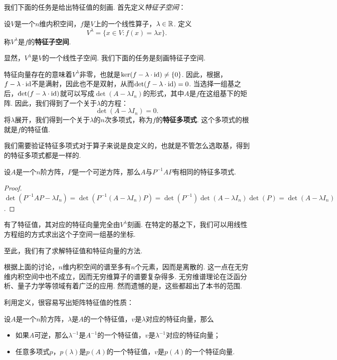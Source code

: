 我们下面的任务是给出特征值的刻画. 首先定义\textit{特征子空间}：

\begin{definition}[特征子空间]
设$V$是一个$n$维内积空间，$f$是$V$上的一个线性算子，$\lambda\in\mathbb{R}$. 定义
\[V^\lambda=\{x\in V:f(x)=\lambda x\}.\]
称$V^\lambda$是$f$的\textbf{特征子空间}. 
\end{definition}

显然，$V^\lambda$是$V$的一个线性子空间. 我们下面的任务是刻画特征子空间. 

特征向量存在的意味着$V^\lambda$非零，也就是$\ker(f-\lambda\cdot \mathrm{id})\neq\{0\}$. 因此，根据，$f-\lambda\cdot \mathrm{id}$不是满射，因此也不是双射，从而$\det(f-\lambda\cdot \mathrm{id})=0$. 当选择一组基之后，$\det(f-\lambda\cdot \mathrm{id})$就可以写成$\det(A-\lambda I_n)$的形式，其中$A$是$f$在这组基下的矩阵. 因此，我们得到了一个关于$\lambda$的方程：
\begin{equation}\label{eq:characteristic-equation}
    \det(A-\lambda I_n)=0.
\end{equation}
将$\lambda$展开，我们得到一个关于$\lambda$的$n$次多项式，称为$f$的\textbf{特征多项式}. 这个多项式的根就是$f$的特征值. 

我们需要验证特征多项式对于算子来说是良定义的，也就是不管怎么选取基，得到的特征多项式都是一样的.

\begin{proposition}\label{proposition:similar-matrix-same-characteristic-polynomial}
    设$A$是一个$n$阶方阵，$P$是一个可逆方阵，那么$A$与$P^{-1}AP$有相同的特征多项式. 
\end{proposition}
\begin{proof}
    $\det(P^{-1}AP-\lambda I_n)=\det(P^{-1}(A-\lambda I_n)P)=\det(P^{-1})\det(A-\lambda I_n)\det(P)=\det(A-\lambda I_n)$.
\end{proof}

有了特征值，其对应的特征向量完全由$V^\lambda$刻画. 在特定的基之下，我们可以用线性方程组的方式求出这个子空间一组基的坐标. 

至此，我们有了求解特征值和特征向量的方法. 

\begin{remark}
根据上面的讨论，$n$维内积空间的谱至多有$n$个元素，因而是离散的. 这一点在无穷维内积空间中也不成立，因而无穷维算子的谱要复杂得多. 无穷维谱理论在泛函分析、量子力学等领域有着广泛的应用. 然而遗憾的是，这些都超出了本书的范围.
\end{remark}

利用定义，很容易写出矩阵特征值的性质：
\begin{proposition}
设$A$是一个$n$阶方阵，$\lambda$是$A$的一个特征值，$v$是$\lambda$对应的特征向量，那么
\begin{itemize}
    \item 如果$A$可逆，那么$\lambda^{-1}$是$A^{-1}$的一个特征值，$v$是$\lambda^{-1}$对应的特征向量；
    \item 任意多项式$p$，$p(\lambda)$是$p(A)$的一个特征值，$v$是$p(A)$的一个特征向量. 
\end{itemize}
\end{proposition}

